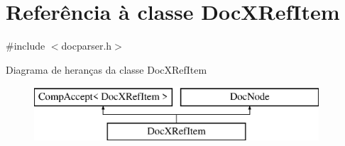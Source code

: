\hypertarget{class_doc_x_ref_item}{\section{Referência à classe Doc\-X\-Ref\-Item}
\label{class_doc_x_ref_item}
}


{\ttfamily \#include $<$docparser.\-h$>$}

Diagrama de heranças da classe Doc\-X\-Ref\-Item\begin{figure}[H]
\begin{center}
\leavevmode
\includegraphics[height=2.000000cm]{class_doc_x_ref_item}
\end{center}
\end{figure}

